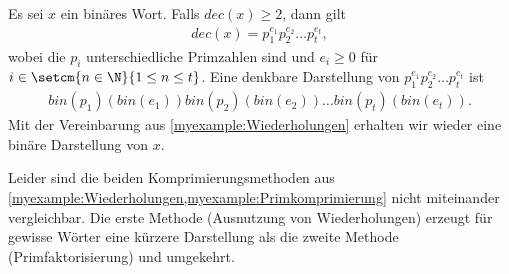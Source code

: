 \begin{myexample}\label{myexample:Primkomprimierung}
Es sei $x$ ein binäres Wort. Falls $dec(x) \geq 2$, dann gilt
\begin{align*}
	dec(x) = p_1^{e_1}p_2^{e_2}\ldots p_t^{e_t},
\end{align*}
wobei die $p_i$ unterschiedliche Primzahlen sind und $e_i\geq 0$ für $i\in\setcm{n\in\N}{1\leq n\leq t}$.
Eine denkbare Darstellung von $p_1^{e_1}p_2^{e_2}\ldots p_t^{e_t}$ ist
\begin{align*}
	bin(p_1)(bin(e_1))bin(p_2)(bin(e_2))\ldots bin(p_t)(bin(e_t)).
\end{align*}
Mit der Vereinbarung aus \cref{myexample:Wiederholungen} erhalten wir wieder eine binäre Darstellung von $x$.
\end{myexample}

Leider sind die beiden Komprimierungsmethoden aus \cref{myexample:Wiederholungen,myexample:Primkomprimierung} nicht miteinander vergleichbar. Die erste Methode (Ausnutzung von Wiederholungen) erzeugt für gewisse Wörter eine kürzere Darstellung als die zweite Methode (Primfaktorisierung) und umgekehrt.


